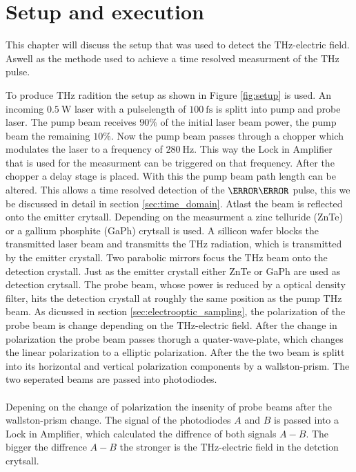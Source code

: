 \chapter{Setup and execution}
This chapter will discuss the setup that was used to detect the $\si{\tera\hertz}$-electric field.
Aswell as the methode used to achieve a time resolved measurment of the $\si{\tera\hertz}$ pulse.

\label{Setup}
To produce $\si{\tera\hertz}$ radition the setup as shown in Figure \ref{fig:setup} is used.
An incoming $\SI{0.5}{\W}$ laser with a pulselength of $\SI{100}{\femto\second}$ is splitt into pump and probe laser.
The pump beam receives $90\%$ of the initial laser beam power, the pump beam the remaining $10\%$.
Now the pump beam passes through a chopper which modulates the laser to a frequency of $\SI{280}{\hertz}$.
This way the Lock in Amplifier that is used for the measurment can be triggered on that frequency.
After the chopper a delay stage is placed.
With this the pump beam path length can be altered.
This allows a time resolved detection of the $\tera\hertz$ pulse, this we be discussed in detail in section \ref{sec:time_domain}.
Atlast the beam is reflected onto the emitter crytsall.
Depending on the measurment a zinc telluride (ZnTe) or a gallium phosphite (GaPh) crytsall is used.
A sillicon wafer blocks the transmitted laser beam and transmitts the $\si{\tera\hertz}$ radiation, which is transmitted by the emitter crystall.
Two parabolic mirrors focus the $\si{\tera\hertz}$ beam onto the detection crystall.
Just as the emitter crystall either ZnTe or GaPh are used as detection crytsall.
The probe beam, whose power is reduced by a optical density filter, hits the detection crystall at roughly the same position as the pump $\si{\tera\hertz}$ beam.
As dicussed in section \ref{sec:electrooptic_sampling}, the polarization of the probe beam is change depending on the $\si{\tera\hertz}$-electric field.
After the change in polarization the probe beam passes thorugh a quater-wave-plate, which changes the linear polarization to a elliptic polarization.
After the the two beam is splitt into its horizontal and vertical polarization components by a wallston-prism.
The two seperated beams are passed into photodiodes.
\\\\
Depening on the change of polarization the insenity of probe beams after the wallston-prism change.
The signal of the photodiodes $A$ and $B$ is passed into a Lock in Amplifier, which calculated the diffrence of both signals $A-B$.
The bigger the diffrence $A-B$ the stronger is the $\si{\tera\hertz}$-electric field in the detction crytsall.

